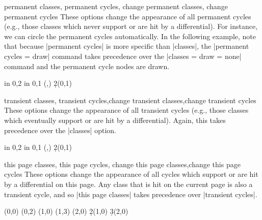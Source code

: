 \begin{sseqdata}[name = basic, cohomological Serre grading]
\begin{stylekeylist}{permanent classes, permanent cycles, change permanent classes, change permanent cycles}
These options change the appearance of all permanent cycles (e.g., those classes which never support or are hit by a differential). For instance, we can circle the permanent cycles automatically. In the following example, note that because |permanent cycles| is more specific than |classes|, the |permanent cycles = {draw}| command takes precedence over the |classes = {draw = none}| command and the permanent cycle nodes are drawn.
\begin{codeexample}[width = 6.5cm]
\begin{sseqpage}[ cohomological Serre grading,
                  classes = { draw = none },
                  permanent cycles = {draw} ]
\foreach \x in {0,2} \foreach \y in {0,1} {
    \class["\mathbb{Z}"](\x,\y)
}
\d2(0,1)
\end{sseqpage}
\end{codeexample}
\end{stylekeylist}

\begin{stylekeylist}{transient classes, transient cycles,change transient classes,change transient cycles}
These options change the appearance of all transient cycles (e.g., those classes which eventually support or are hit by a differential). Again, this takes precedence over the |classes| option.
\begin{codeexample}[width = 6.5cm]
\begin{sseqpage}[ cohomological Serre grading,
                  classes = { draw = none },
                  transient cycles = red ]
\foreach \x in {0,2} \foreach \y in {0,1} {
    \class["\mathbb{Z}"](\x,\y)
}
\d2(0,1)
\end{sseqpage}
\end{codeexample}
\end{stylekeylist}

\begin{stylekeylist}{this page classes, this page cycles, change this page classes,change this page cycles}
These options change the appearance of all cycles which support or are hit by a differential on this page. Any class that is hit on the current page is also a transient cycle, and so |this page classes| takes precedence over |transient cycles|.
\begin{codeexample}[width = 6cm]
\begin{sseqdata}[ name = this page cycles example, Adams grading,
                  transient cycles = { red, fill }, this page cycles = { blue } ]
\class(0,0)
\class(0,2) \class(1,0)
\class(1,3) \class(2,0)
\d2(1,0) \d3(2,0)
\end{sseqdata}
\printpage[ name = this page cycles example, page = 2 ] \qquad
\printpage[ name = this page cycles example, page = 3 ]
\end{codeexample}
\end{stylekeylist}


\end{sseqdata}
